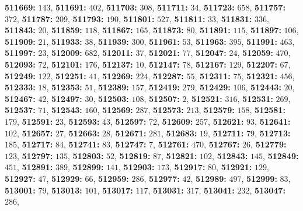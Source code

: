 \textsf{\bfseries 511669:} $143$, \textsf{\bfseries 511691:} $402$, \textsf{\bfseries 511703:} $308$, \textsf{\bfseries 511711:} $34$, \textsf{\bfseries 511723:} $658$, \textsf{\bfseries 511757:} $372$, \textsf{\bfseries 511787:} $209$, \textsf{\bfseries 511793:} $190$, \textsf{\bfseries 511801:} $527$, \textsf{\bfseries 511811:} $33$, \textsf{\bfseries 511831:} $336$, \textsf{\bfseries 511843:} $20$, \textsf{\bfseries 511859:} $118$, \textsf{\bfseries 511867:} $165$, \textsf{\bfseries 511873:} $80$, \textsf{\bfseries 511891:} $115$, \textsf{\bfseries 511897:} $106$, \textsf{\bfseries 511909:} $21$, \textsf{\bfseries 511933:} $38$, \textsf{\bfseries 511939:} $300$, \textsf{\bfseries 511961:} $53$, \textsf{\bfseries 511963:} $395$, \textsf{\bfseries 511991:} $463$, \textsf{\bfseries 511997:} $23$, \textsf{\bfseries 512009:} $682$, \textsf{\bfseries 512011:} $37$, \textsf{\bfseries 512021:} $77$, \textsf{\bfseries 512047:} $24$, \textsf{\bfseries 512059:} $470$, \textsf{\bfseries 512093:} $72$, \textsf{\bfseries 512101:} $176$, \textsf{\bfseries 512137:} $10$, \textsf{\bfseries 512147:} $78$, \textsf{\bfseries 512167:} $129$, \textsf{\bfseries 512207:} $67$, \textsf{\bfseries 512249:} $122$, \textsf{\bfseries 512251:} $41$, \textsf{\bfseries 512269:} $224$, \textsf{\bfseries 512287:} $55$, \textsf{\bfseries 512311:} $75$, \textsf{\bfseries 512321:} $456$, \textsf{\bfseries 512333:} $18$, \textsf{\bfseries 512353:} $51$, \textsf{\bfseries 512389:} $157$, \textsf{\bfseries 512419:} $279$, \textsf{\bfseries 512429:} $106$, \textsf{\bfseries 512443:} $20$, \textsf{\bfseries 512467:} $42$, \textsf{\bfseries 512497:} $30$, \textsf{\bfseries 512503:} $108$, \textsf{\bfseries 512507:} $2$, \textsf{\bfseries 512521:} $316$, \textsf{\bfseries 512531:} $269$, \textsf{\bfseries 512537:} $71$, \textsf{\bfseries 512543:} $160$, \textsf{\bfseries 512569:} $287$, \textsf{\bfseries 512573:} $213$, \textsf{\bfseries 512579:} $158$, \textsf{\bfseries 512581:} $179$, \textsf{\bfseries 512591:} $23$, \textsf{\bfseries 512593:} $43$, \textsf{\bfseries 512597:} $72$, \textsf{\bfseries 512609:} $257$, \textsf{\bfseries 512621:} $93$, \textsf{\bfseries 512641:} $102$, \textsf{\bfseries 512657:} $27$, \textsf{\bfseries 512663:} $28$, \textsf{\bfseries 512671:} $281$, \textsf{\bfseries 512683:} $19$, \textsf{\bfseries 512711:} $79$, \textsf{\bfseries 512713:} $185$, \textsf{\bfseries 512717:} $84$, \textsf{\bfseries 512741:} $83$, \textsf{\bfseries 512747:} $7$, \textsf{\bfseries 512761:} $470$, \textsf{\bfseries 512767:} $26$, \textsf{\bfseries 512779:} $123$, \textsf{\bfseries 512797:} $135$, \textsf{\bfseries 512803:} $52$, \textsf{\bfseries 512819:} $87$, \textsf{\bfseries 512821:} $102$, \textsf{\bfseries 512843:} $145$, \textsf{\bfseries 512849:} $451$, \textsf{\bfseries 512891:} $389$, \textsf{\bfseries 512899:} $141$, \textsf{\bfseries 512903:} $173$, \textsf{\bfseries 512917:} $80$, \textsf{\bfseries 512921:} $129$, \textsf{\bfseries 512927:} $47$, \textsf{\bfseries 512929:} $66$, \textsf{\bfseries 512959:} $286$, \textsf{\bfseries 512977:} $42$, \textsf{\bfseries 512989:} $497$, \textsf{\bfseries 512999:} $83$, \textsf{\bfseries 513001:} $79$, \textsf{\bfseries 513013:} $101$, \textsf{\bfseries 513017:} $117$, \textsf{\bfseries 513031:} $317$, \textsf{\bfseries 513041:} $232$, \textsf{\bfseries 513047:} $286$, 
